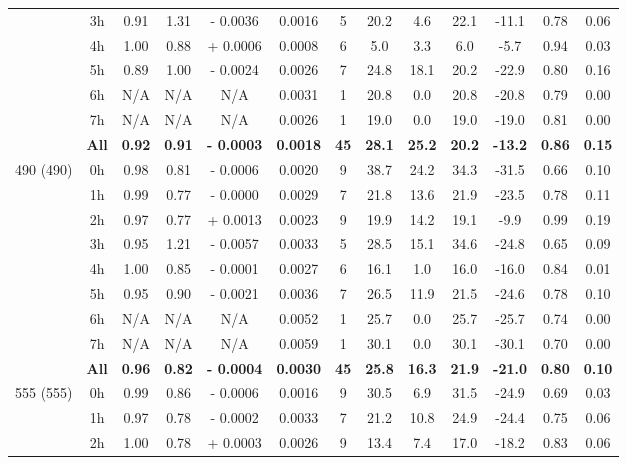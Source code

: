 \documentclass[onecolumn,3p,letterpaper,11pt]{elsarticle}
\begin{document}
\begin{table}[htbp!]
\begin{tabular}{ccccccccccccc}
 & 3h  & 0.91 & 1.31 & - 0.0036 & 0.0016 &  5 & 20.2 & 4.6 & 22.1 & -11.1 & 0.78 & 0.06 \\ 
 & 4h  & 1.00 & 0.88 & + 0.0006 & 0.0008 &  6 & 5.0 & 3.3 & 6.0 & -5.7 & 0.94 & 0.03 \\ 
 & 5h  & 0.89 & 1.00 & - 0.0024 & 0.0026 &  7 & 24.8 & 18.1 & 20.2 & -22.9 & 0.80 & 0.16 \\ 
 & 6h  & N/A & N/A & N/A & 0.0031 &  1 & 20.8 & 0.0 & 20.8 & -20.8 & 0.79 & 0.00\\ 
 & 7h  & N/A & N/A & N/A & 0.0026 &  1 & 19.0 & 0.0 & 19.0 & -19.0 & 0.81 & 0.00\\ \cline{2-13}
 & \textbf{All} & \textbf{0.92} & \textbf{0.91} & \textbf{- 0.0003} & \textbf{0.0018} & \textbf{45} & \textbf{28.1} & \textbf{25.2} & \textbf{20.2} & \textbf{-13.2} & \textbf{0.86} & \textbf{0.15} \\ \hline
\multirow{9}{*}{490 (490)} & 0h  & 0.98 & 0.81 & - 0.0006 & 0.0020 &  9 & 38.7 & 24.2 & 34.3 & -31.5 & 0.66 & 0.10 \\ 
 & 1h  & 0.99 & 0.77 & - 0.0000 & 0.0029 &  7 & 21.8 & 13.6 & 21.9 & -23.5 & 0.78 & 0.11 \\ 
 & 2h  & 0.97 & 0.77 & + 0.0013 & 0.0023 &  9 & 19.9 & 14.2 & 19.1 & -9.9 & 0.99 & 0.19 \\ 
 & 3h  & 0.95 & 1.21 & - 0.0057 & 0.0033 &  5 & 28.5 & 15.1 & 34.6 & -24.8 & 0.65 & 0.09 \\ 
 & 4h  & 1.00 & 0.85 & - 0.0001 & 0.0027 &  6 & 16.1 & 1.0 & 16.0 & -16.0 & 0.84 & 0.01 \\ 
 & 5h  & 0.95 & 0.90 & - 0.0021 & 0.0036 &  7 & 26.5 & 11.9 & 21.5 & -24.6 & 0.78 & 0.10 \\ 
 & 6h  & N/A & N/A & N/A & 0.0052 &  1 & 25.7 & 0.0 & 25.7 & -25.7 & 0.74 & 0.00\\ 
 & 7h  & N/A & N/A & N/A & 0.0059 &  1 & 30.1 & 0.0 & 30.1 & -30.1 & 0.70 & 0.00\\ \cline{2-13}
 & \textbf{All} & \textbf{0.96} & \textbf{0.82} & \textbf{- 0.0004} & \textbf{0.0030} & \textbf{45} & \textbf{25.8} & \textbf{16.3} & \textbf{21.9} & \textbf{-21.0} & \textbf{0.80} & \textbf{0.10} \\ \hline
\multirow{9}{*}{555 (555)} & 0h  & 0.99 & 0.86 & - 0.0006 & 0.0016 &  9 & 30.5 & 6.9 & 31.5 & -24.9 & 0.69 & 0.03 \\ 
 & 1h  & 0.97 & 0.78 & - 0.0002 & 0.0033 &  7 & 21.2 & 10.8 & 24.9 & -24.4 & 0.75 & 0.06 \\ 
 & 2h  & 1.00 & 0.78 & + 0.0003 & 0.0026 &  9 & 13.4 & 7.4 & 17.0 & -18.2 & 0.83 & 0.06 \\ 

\end{tabular}
\end{table}
\end{document}
